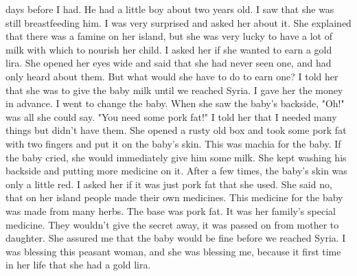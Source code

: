 days before I had. He had a little boy about two years old. I saw that 
she was still breastfeeding him. I was very surprised and asked her about 
it. She explained that there was a famine on her island, but she was very 
lucky to have a lot of milk with which to nourish her child. I asked her 
if she wanted to earn a gold lira. She opened her eyes wide and said that 
she had never seen one, and had only heard about them. But what would 
she have to do to earn one? I told her that she was to give the baby milk 
until we reached Syria. 
I gave her the money in advance. I went to change the baby. When 
she saw the baby's backside, "Oh!" was all she could say. "You need some 
pork fat!" I told her that I needed many things but didn't have them. 
She opened a rusty old box and took some pork fat with two fingers and put 
it on the baby's skin. This was machia for the baby. 
If the baby cried, she would immediately give him some milk. She 
kept washing his backside and putting more medicine on it. After a few 
times, the baby's skin was only a little red. I asked her if it was just 
pork fat that she used. She said no, that on her island people made their own medicines. This medicine for the baby was made from many herbs. The 
base was pork fat. It was her family's special medicine. They wouldn't 
give the secret away, it was passed on from mother to daughter. 
She assured me that the baby would be fine before we reached Syria. 
I was blessing this peasant woman, and she was blessing me, because it 
first time in her life that she had a gold lira. 

